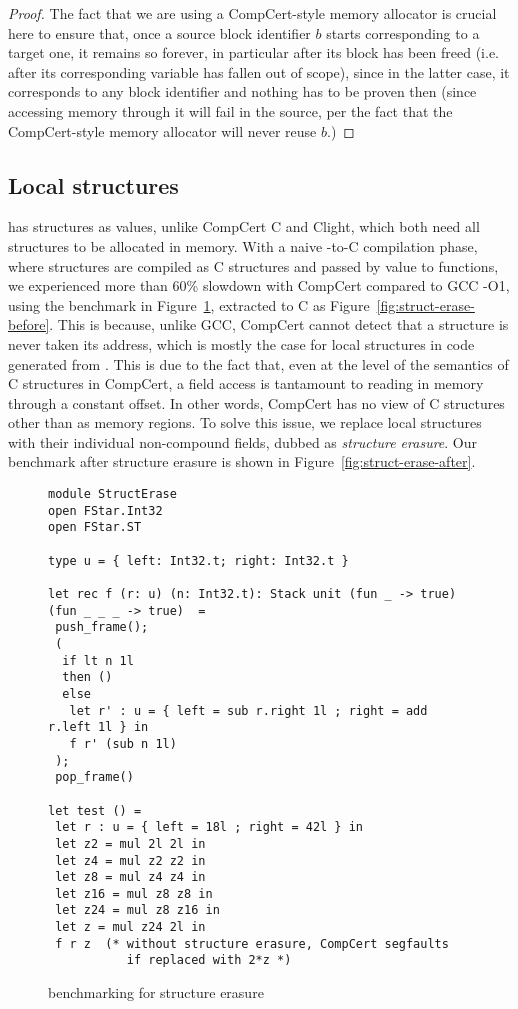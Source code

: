 \begin{proof}
  The fact that we are using a CompCert-style memory allocator is
  crucial here to ensure that, once a source block identifier $b$
  starts corresponding to a target one, it remains so forever, in
  particular after its block has been freed (i.e. after its
  corresponding variable has fallen out of scope), since in the latter
  case, it corresponds to any block identifier and nothing has to be
  proven then (since accessing memory through it will fail in the
  source, per the fact that the CompCert-style memory allocator will
  never reuse $b$.)
\end{proof}

\subsection{Local structures} \label{sec:local-struct}

\cstar has structures as values, unlike CompCert C and Clight, which both
need all structures to be allocated in memory. With a naive \cstar-to-C
compilation phase, where \cstar structures are compiled as C structures
and passed by value to functions, we experienced more than 60\%
slowdown with CompCert compared to GCC -O1, using the \lamstar
benchmark in Figure~\ref{fig:struct-erase-benchmark}, extracted to C as Figure~\ref{fig:struct-erase-before}. This
is because, unlike GCC, CompCert cannot detect that a structure is
never taken its address, which is mostly the case for local structures
in code generated from \cstar. This is due to the fact that, even at the
level of the semantics of C structures in CompCert, a field access is
tantamount to reading in memory through a constant offset. In other
words, CompCert has no view of C structures other than as memory
regions. To solve this issue, we replace local structures with their
individual non-compound fields, dubbed as \emph{structure erasure}. Our
benchmark after structure erasure is shown in Figure~\ref{fig:struct-erase-after}.

\begin{figure}
\begin{lstlisting}[language=fstar]
module StructErase
open FStar.Int32
open FStar.ST

type u = { left: Int32.t; right: Int32.t }

let rec f (r: u) (n: Int32.t): Stack unit (fun _ -> true) (fun _ _ _ -> true)  =
 push_frame();
 (
  if lt n 1l
  then ()
  else
   let r' : u = { left = sub r.right 1l ; right = add r.left 1l } in
   f r' (sub n 1l)
 );
 pop_frame()

let test () = 
 let r : u = { left = 18l ; right = 42l } in
 let z2 = mul 2l 2l in
 let z4 = mul z2 z2 in
 let z8 = mul z4 z4 in
 let z16 = mul z8 z8 in
 let z24 = mul z8 z16 in
 let z = mul z24 2l in
 f r z  (* without structure erasure, CompCert segfaults
           if replaced with 2*z *)
\end{lstlisting}
\caption{\lowstar benchmarking for structure erasure}
\label{fig:struct-erase-benchmark}
\end{figure}

